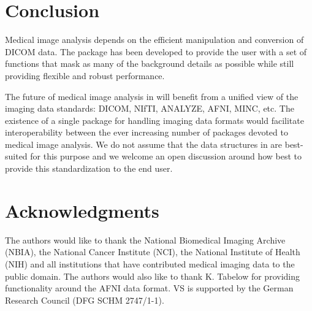 \documentclass[
]{jss}
\begin{document}
\section{Conclusion}

Medical image analysis depends on the efficient manipulation and
conversion of DICOM data. The  package has been developed
to provide the user with a set of functions that mask as many of the
background details as possible while still providing flexible and robust
performance.

The future of medical image analysis in  will benefit from a
unified view of the imaging data standards: DICOM, NIfTI, ANALYZE, AFNI,
MINC, etc. The existence of a single package for handling imaging data
formats would facilitate interoperability between the ever increasing
number of  packages devoted to medical image analysis. We do
not assume that the data structures in  are best-suited
for this purpose and we welcome an open discussion around how best to
provide this standardization to the end user.

\section*{Acknowledgments}

The authors would like to thank the National Biomedical Imaging Archive
(NBIA), the National Cancer Institute (NCI), the National Institute of
Health (NIH) and all institutions that have contributed medical imaging
data to the public domain. The authors would also like to thank K.
Tabelow for providing functionality around the AFNI data format. VS is
supported by the German Research Council (DFG SCHM 2747/1-1).


\end{document}
